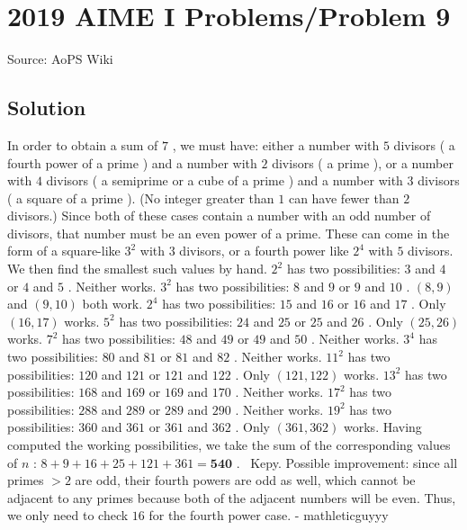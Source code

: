 \documentclass[12pt]{article}
\begin{document}
\section*{{2019 AIME I Problems/Problem 9}}
Source: AoPS Wiki

\subsection*{Solution}
In order to obtain a sum of $7$ , we must have: either a number with $5$ divisors ( a fourth power of a prime ) and a number with $2$ divisors ( a prime ), or a number with $4$ divisors ( a semiprime or a cube of a prime ) and a number with $3$ divisors ( a square of a prime ). (No integer greater than $1$ can have fewer than $2$ divisors.) Since both of these cases contain a number with an odd number of divisors, that number must be an even power of a prime. These can come in the form of a square-like $3^2$ with $3$ divisors, or a fourth power like $2^4$ with $5$ divisors. We then find the smallest such values by hand. $2^2$ has two possibilities: $3$ and $4$ or $4$ and $5$ . Neither works. $3^2$ has two possibilities: $8$ and $9$ or $9$ and $10$ . $\boxed{(8,9)}$ and $\boxed{(9,10)}$ both work. $2^4$ has two possibilities: $15$ and $16$ or $16$ and $17$ . Only $\boxed{(16,17)}$ works. $5^2$ has two possibilities: $24$ and $25$ or $25$ and $26$ . Only $\boxed{(25,26)}$ works. $7^2$ has two possibilities: $48$ and $49$ or $49$ and $50$ . Neither works. $3^4$ has two possibilities: $80$ and $81$ or $81$ and $82$ . Neither works. $11^2$ has two possibilities: $120$ and $121$ or $121$ and $122$ . Only $\boxed{(121,122)}$ works. $13^2$ has two possibilities: $168$ and $169$ or $169$ and $170$ . Neither works. $17^2$ has two possibilities: $288$ and $289$ or $289$ and $290$ . Neither works. $19^2$ has two possibilities: $360$ and $361$ or $361$ and $362$ . Only $\boxed{(361,362)}$ works. Having computed the working possibilities, we take the sum of the corresponding values of $n$ : $8+9+16+25+121+361 = \boxed{\textbf{540}}$ . ~Kepy. Possible improvement: since all primes $>2$ are odd, their fourth powers are odd as well, which cannot be adjacent to any primes because both of the adjacent numbers will be even. Thus, we only need to check $16$ for the fourth power case. - mathleticguyyy
\end{document}
